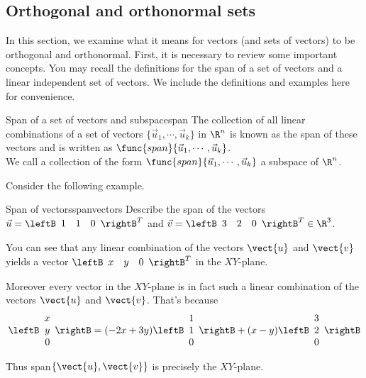 \subsection{Orthogonal and orthonormal sets}

In this section, we examine what it means for vectors (and sets of
vectors) to be orthogonal and orthonormal. First, it is necessary to
review some important concepts. You may recall the definitions for the
span of a set of vectors and a linear independent set of vectors. We
include the definitions and examples here for convenience.

\begin{definition}{Span of a set of vectors and subspace}{span}
The collection of all linear combinations of a set of vectors $\{ \vec{u}_1,
\cdots ,\vec{u}_k\}$ in $\R^{n}$ is known as the span of these
vectors and is written as $\func{span} \{\vec{u}_1, \cdots ,
\vec{u}_k\}$. \\ 
We call a collection of the form $\func{span} \{\vec{u}_1, \cdots , \vec{u}_k\}$ 
a subspace of $\R^{n}$.
\end{definition}

Consider the following example. 

\begin{example}{Span of vectors}{spanvectors}
Describe the span of the vectors $\vec{u}=\leftB 
\begin{array}{rrr}
1  & 1 & 0
\end{array}
\rightB^T$ and
$\vec{v}=\leftB 
\begin{array}{rrr}
3  & 2 & 0
\end{array}
\rightB^T \in \R^{3}$.
\end{example}

\begin{solution}
You can see that any linear combination of the vectors $\vect{u}$ and $\vect{v}$ yields a vector 
$\leftB 
\begin{array}{rrr}
x  & y & 0
\end{array}
\rightB^T$ in the $XY$-plane. 

Moreover every vector in the $XY$-plane is in fact such a linear
combination of the vectors $\vect{u}$ and $\vect{v}$. That's because
\[ \leftB 
\begin{array}{r}
x \\
y \\
0
\end{array}
\rightB 
=
(-2x+3y) \leftB 
\begin{array}{r}
1 \\
1 \\
0
\end{array}
\rightB
+
(x-y)\leftB 
\begin{array}{r}
3 \\
2 \\
0
\end{array}
\rightB 
\]

Thus  span$\{\vect{u},\vect{v}\}$ is precisely the $XY$-plane.
\end{solution}

